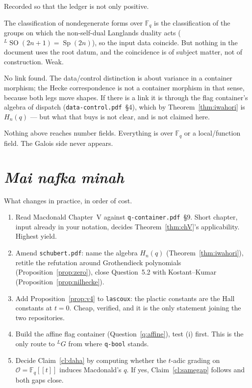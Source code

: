 \documentclass[11pt,a4paper]{article}
\theoremstyle{definition}
\theoremstyle{remark}
\newcommand{\FF}{\mathbb{F}}
\newcommand{\OO}{\mathcal{O}}
\newcommand{\dual}[1]{{}^{L}\!#1}
\DeclareMathOperator{\SO}{SO}
\DeclareMathOperator{\Sp}{Sp}
\begin{document}
Recorded so that the ledger is not only positive.

\begin{description}[leftmargin=1.6em,style=nextline,nosep]
\item[\texttt{finite-field-duality.pdf}.] The classification of nondegenerate
forms over $\FF_q$ is the classification of the groups on which the
non-self-dual Langlands duality acts ($\dual{\SO(2n+1)} = \Sp(2n)$), so the
input data coincide. But nothing in the document uses the root datum, and the
coincidence is of subject matter, not of construction. Weak.
\item[\texttt{error-correcting.pdf}, \texttt{data-control.pdf}.] No link found.
The data/control distinction is about variance in a container morphism; the
Hecke correspondence is not a container morphism in that sense, because both
legs move shapes. If there is a link it is through the flag container's algebra
of dispatch (\texttt{data-control.pdf}~\S4), which by
Theorem~\ref{thm:iwahori} is $H_n(q)$ --- but what that buys is not clear, and
is not claimed here.
\item[Arithmetic Langlands.] Nothing above reaches number fields. Everything is
over $\FF_q$ or a local/function field. The Galois side never appears.
\end{description}

\section{\emph{Mai nafka minah}}\label{sec:nafka}

What changes in practice, in order of cost.

\begin{enumerate}[nosep,label=\arabic*.]
\item Read Macdonald Chapter~V against \texttt{q-container.pdf}~\S9. Short
chapter, input already in your notation, decides
Theorem~\ref{thm:chV}'s applicability. Highest yield.
\item Amend \texttt{schubert.pdf}: name the algebra $H_n(q)$
(Theorem~\ref{thm:iwahori}), retitle the refutation around Grothendieck
polynomials (Proposition~\ref{prop:zero}), close Question~5.2 with
Kostant--Kumar (Proposition~\ref{prop:nilhecke}).
\item Add Proposition~\ref{prop:v4} to \texttt{lascoux}: the plactic constants
are the Hall constants at $t=0$. Cheap, verified, and it is the only statement
joining the two repositories.
\item Build the affine flag container (Question~\ref{q:affine}), test (i)
first. This is the only route to $\dual{G}$ from where \texttt{q-bool} stands.
\item Decide Claim~\ref{cl:daha} by computing whether the $t$-adic grading on
$\OO = \FF_q[[t]]$ induces Macdonald's $q$. If yes, Claim~\ref{cl:samegap}
follows and both gaps close.
\end{enumerate}
\end{document}
